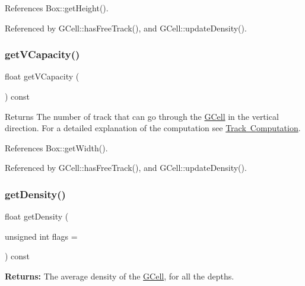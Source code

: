 References Box\+::get\+Height().



Referenced by G\+Cell\+::has\+Free\+Track(), and G\+Cell\+::update\+Density().

\mbox{\label{classKatabatic_1_1GCell_a3994e204ebccf8aa12899e0c5ef4112b}} 
\subsubsection{\texorpdfstring{get\+V\+Capacity()}{getVCapacity()}}
{\footnotesize\ttfamily float get\+V\+Capacity (\begin{DoxyParamCaption}{ }\end{DoxyParamCaption}) const}

\begin{DoxyReturn}{Returns}
The number of track that can go through the \mbox{\hyperlink{classKatabatic_1_1GCell}{G\+Cell}} in the vertical direction. For a detailed explanation of the computation see \mbox{\hyperlink{classKatabatic_1_1GCell_secGCellTrackComputation}{Track Computation}}. 
\end{DoxyReturn}


References Box\+::get\+Width().



Referenced by G\+Cell\+::has\+Free\+Track(), and G\+Cell\+::update\+Density().

\mbox{\label{classKatabatic_1_1GCell_ad31c16c87377e164728a0df55e21f96b}} 
\subsubsection{\texorpdfstring{get\+Density()}{getDensity()}}
{\footnotesize\ttfamily float get\+Density (\begin{DoxyParamCaption}\item[{unsigned int}]{flags = {} }\end{DoxyParamCaption}) const}

{\bfseries Returns\+:} The average density of the \mbox{\hyperlink{classKatabatic_1_1GCell}{G\+Cell}}, for all the depths.


